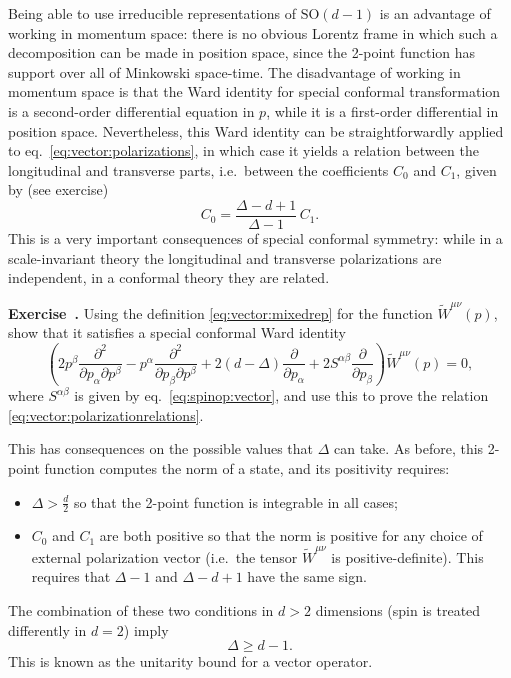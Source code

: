 \documentclass[a4paper,12pt]{article}
\newcommand{\SO}{\text{SO}}
\numberwithin{equation}{section}
\newcounter{exercise}[section]
\newenvironment{exercise}[1][]%
	{\refstepcounter{exercise}\bigskip
	\begin{mdframed}[backgroundcolor=gray!20, linewidth=0]
	\noindent\textbf{Exercise~\thesection.\theexercise #1} \rmfamily}
  	{\end{mdframed}\bigskip}
\begin{document}
Being able to use irreducible representations of $\SO(d-1)$ is an advantage of working in momentum space: there is no obvious Lorentz frame in which such a decomposition can be made in position space, since the 2-point function has support over all of Minkowski space-time. The disadvantage of working in momentum space is that the Ward identity for special conformal transformation is a second-order differential equation in $p$, while it is a first-order differential in position space.
Nevertheless, this Ward identity can be straightforwardly applied to eq.~\eqref{eq:vector:polarizations}, in which case it yields a relation between the longitudinal and transverse parts, i.e.~between the coefficients $C_0$ and $C_1$, given by (see exercise)
\begin{equation}
	C_0 = \frac{\Delta - d + 1}{\Delta - 1} \, C_1.
	\label{eq:vector:polarizationrelations}
\end{equation}
This is a very important consequences of special conformal symmetry: 
while in a scale-invariant theory the longitudinal and transverse polarizations are independent, in a conformal theory they are related.
%
\begin{exercise}
	Using the definition \eqref{eq:vector:mixedrep} for the function
	$\widetilde{W}^{\mu\nu}(p)$, show that it satisfies a special
	conformal Ward identity
	$$
	\left( 2 p^\beta
	\frac{\partial^2}{\partial p_\alpha \partial p^\beta}
	- p^\alpha
	\frac{\partial^2}{\partial p_\beta \partial p^\beta}
	+ 2 (d - \Delta) \frac{\partial}{\partial p_\alpha}
	+ 2 S^{\alpha\beta} \frac{\partial}{\partial p_\beta} \right)
	\widetilde{W}^{\mu\nu}(p) = 0,
	$$
	where $S^{\alpha\beta}$ is given by eq.~\eqref{eq:spinop:vector},
	and use this to prove the relation
	\eqref{eq:vector:polarizationrelations}.
\end{exercise}
%
This has consequences on the possible values that $\Delta$ can take. As before, this 2-point function computes the norm of a state, and its positivity requires:
\begin{itemize}

\item
$\Delta > \frac{d}{2}$ so that the 2-point function is integrable in all cases;

\item
$C_0$ and $C_1$ are both positive so that the norm is positive for any choice of external polarization vector (i.e.~the tensor $\widetilde{W}^{\mu\nu}$ is positive-definite). This requires that $\Delta - 1$ and $\Delta - d + 1$ have the same sign.

\end{itemize}
%
The combination of these two conditions in $d > 2$ dimensions (spin is treated differently in $d = 2$) imply
\begin{equation}
	\Delta \geq d - 1.
\end{equation}
This is known as the unitarity bound for a vector operator.
\end{document}
